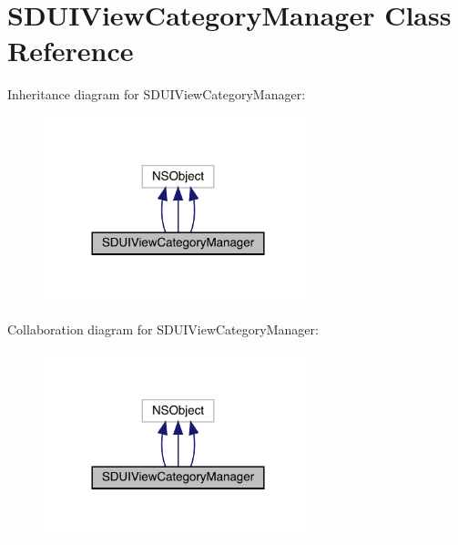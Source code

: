 \hypertarget{interface_s_d_u_i_view_category_manager}{}\section{S\+D\+U\+I\+View\+Category\+Manager Class Reference}
\label{interface_s_d_u_i_view_category_manager}


Inheritance diagram for S\+D\+U\+I\+View\+Category\+Manager\+:\nopagebreak
\begin{figure}[H]
\begin{center}
\leavevmode
\includegraphics[width=221pt]{interface_s_d_u_i_view_category_manager__inherit__graph}
\end{center}
\end{figure}


Collaboration diagram for S\+D\+U\+I\+View\+Category\+Manager\+:\nopagebreak
\begin{figure}[H]
\begin{center}
\leavevmode
\includegraphics[width=221pt]{interface_s_d_u_i_view_category_manager__coll__graph}
\end{center}
\end{figure}
